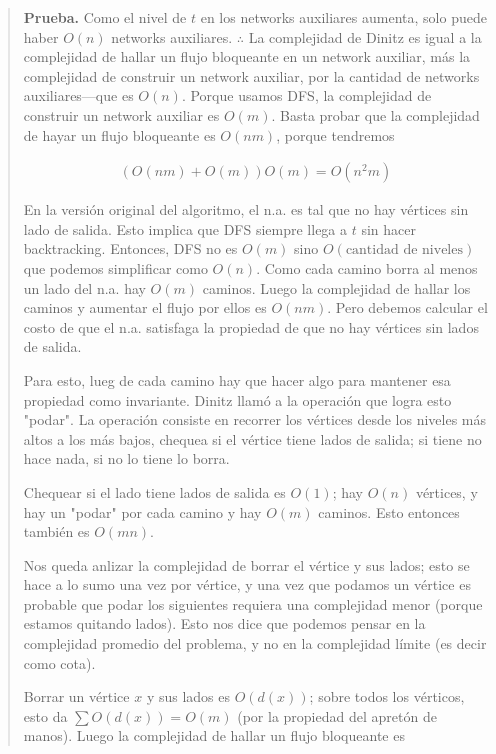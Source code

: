 \documentclass[a4paper]{article}
\begin{document}
\small
\begin{quote}

\textbf{Prueba.} Como el nivel de $t$ en los networks auxiliares aumenta, solo
puede haber $O(n)$ networks auxiliares. $\therefore $ La complejidad de Dinitz
es igual a la complejidad de hallar un flujo bloqueante en un network auxiliar,
más la complejidad de construir un network auxiliar, por la cantidad de
networks auxiliares---que es $O(n)$. Porque usamos DFS, la complejidad de construir un network auxiliar es $O(m)$. Basta probar que la complejidad de hayar un flujo bloqueante es $O(nm)$, porque tendremos 

\begin{align*}
    \left( O(nm) + O(m) \right) O(m) = O(n^2 m)
\end{align*}

En la versión original del algoritmo, el n.a. es tal que no hay vértices sin
lado de salida. Esto implica que DFS siempre llega a $t$ sin hacer
backtracking. Entonces, DFS no es $O(m)$ sino $O(\text{cantidad de niveles})$
que podemos simplificar como $O(n)$. Como cada camino borra al menos un lado
del n.a. hay $O(m)$ caminos. Luego la complejidad de hallar los caminos y
aumentar el flujo por ellos es $O(nm)$. Pero debemos calcular el costo de que
el n.a. satisfaga la propiedad de que no hay vértices sin lados de salida. 

Para esto, lueg de cada camino hay que hacer algo para mantener esa propiedad
como invariante. Dinitz llamó a la operación que logra esto "podar". La
operación consiste en recorrer los vértices desde los niveles más altos a los
más bajos, chequea si el vértice tiene lados de salida; si tiene no hace nada,
si no lo tiene lo borra.

Chequear si el lado tiene lados de salida es $O(1)$; hay $O(n)$ vértices, y hay
un "podar" por cada camino y hay $O(m)$ caminos. Esto entonces también es $O(mn)$.

Nos queda anlizar la complejidad de borrar el vértice y sus lados; esto se hace
a lo sumo una vez por vértice, y una vez que podamos un vértice es probable que podar 
los siguientes requiera una complejidad menor (porque estamos quitando lados).
Esto nos dice que podemos pensar en la complejidad promedio del problema, y no
en la complejidad límite (es decir como cota).

Borrar un vértice $x$ y sus lados es $O\left( d(x) \right) $; sobre todos los
vérticos, esto da $\sum O\left( d(x) \right) = O(m)$ (por la propiedad del
apretón de manos). Luego la complejidad de hallar un flujo bloqueante es 


\end{quote}
\end{document}
